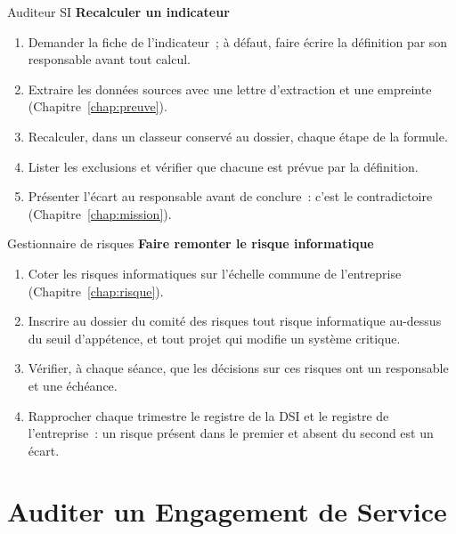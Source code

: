 \begin{boxmetier}{Auditeur SI}
\textbf{Recalculer un indicateur}
\begin{enumerate}
    \item Demander la fiche de l'indicateur~; à défaut, faire écrire la
          définition par son responsable avant tout calcul.
    \item Extraire les données sources avec une lettre d'extraction et une
          empreinte (Chapitre~\ref{chap:preuve}).
    \item Recalculer, dans un classeur conservé au dossier, chaque étape de
          la formule.
    \item Lister les exclusions et vérifier que chacune est prévue par la
          définition.
    \item Présenter l'écart au responsable avant de conclure~: c'est le
          contradictoire (Chapitre~\ref{chap:mission}).
\end{enumerate}
\end{boxmetier}

\begin{boxmetier}{Gestionnaire de risques}
\textbf{Faire remonter le risque informatique}
\begin{enumerate}
    \item Coter les risques informatiques sur l'échelle commune de
          l'entreprise (Chapitre~\ref{chap:risque}).
    \item Inscrire au dossier du comité des risques tout risque informatique
          au-dessus du seuil d'appétence, et tout projet qui modifie un
          système critique.
    \item Vérifier, à chaque séance, que les décisions sur ces risques ont
          un responsable et une échéance.
    \item Rapprocher chaque trimestre le registre de la DSI et le registre
          de l'entreprise~: un risque présent dans le premier et absent du
          second est un écart.
\end{enumerate}
\end{boxmetier}


\section{Auditer un Engagement de Service}
\label{sec:c17-sla}

